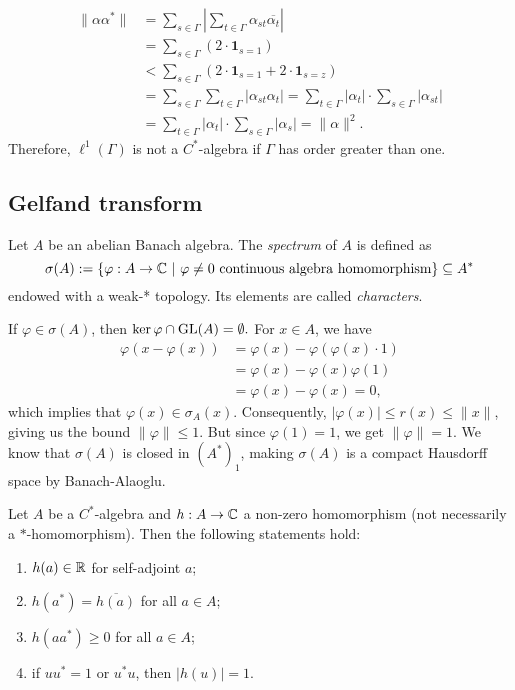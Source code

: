 \begin{example}
\begin{align*}
    \|\alpha \alpha^*\| &= \sum_{s \in \Gamma} \left| \sum_{t \in \Gamma} \alpha_{st} \overline{\alpha_{t}} \right|\\
    &= \sum_{s \in \Gamma} (2 \cdot \mathbf{1}_{s = 1})\\
    &< \sum_{s \in \Gamma} (2 \cdot \mathbf{1}_{s = 1} + 2\cdot \mathbf{1}_{s = z} )\\
    &= \sum_{s \in \Gamma} \sum_{t \in \Gamma} \left| \alpha_{st} {\alpha_{t}} \right| = \sum_{t \in \Gamma}|{\alpha_{t}}| \cdot \sum_{s \in \Gamma}  \left| \alpha_{st}  \right|\\
    &= \sum_{t \in \Gamma} \left|  {\alpha_{t}} \right| \cdot \sum_{s \in \Gamma} |\alpha_{s}| = \| \alpha\|^2.
  \end{align*}
  Therefore, $\ell^1 (\Gamma)$ is not a $C^*$-algebra if $\Gamma$ has order greater than one.
\end{example}

\subsection{Gelfand transform}

\begin{definition}
  Let $A$ be an abelian Banach algebra. The \emph{spectrum} of $A$ is defined as
  $$\sigma (A) := \{\varphi: A \to \mathbb {C}\ |\ \textrm{$\varphi \neq 0$ continuous algebra homomorphism}\} \subseteq A^*$$
  endowed with a weak-* topology. Its elements are called \emph{characters}.
\end{definition}

If $\varphi \in \sigma (A)$, then $\ker \varphi \cap \operatorname{GL}(A) = \emptyset.$
For $x \in A$, we have 
\begin{align*}
  \varphi(x - \varphi(x)) &= \varphi(x) - \varphi(\varphi(x) \cdot 1)\\
  &= \varphi(x) - \varphi(x) \varphi(1)\\
  &= \varphi(x) - \varphi(x) = 0,
\end{align*}
which implies that $\varphi(x) \in \sigma_A(x)$.
Consequently, $|\varphi(x)| \leq r(x)\leq \|x\|$, giving us the bound $\|\varphi\| \leq 1$.
But since $\varphi(1) = 1$, we get $\|\varphi\| = 1$.
We know that $\sigma (A)$ is closed in $(A^*)_1$, making $\sigma(A)$ is a compact Hausdorff space by Banach-Alaoglu.

\begin{proposition}
  Let $A$ be a $C^*$-algebra and $h: A \to \mathbb {C}$ a non-zero homomorphism (not necessarily a $*$-homomorphism). 
  Then the following statements hold:
  \begin{enumerate}
    \item $h(a) \in \mathbb {R}$ for self-adjoint $a$;
    \item $h(a^*) = \overline{h(a)}$ for all $a \in A$;
    \item $h(a a^*) \geq 0$ for all $a \in A$;
    \item if $u u^* = 1$ or $u^* u$, then $|h(u)| = 1$. 
  \end{enumerate}
\end{proposition}

